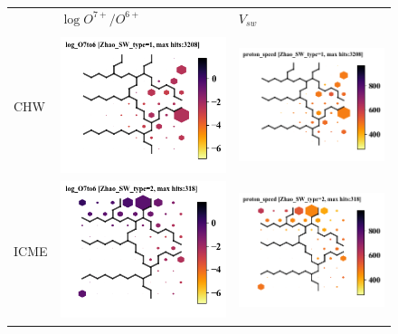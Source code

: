 \documentclass[utf8]{frontiersSCNS} %
\begin{document}
\begin{figure}[h!]\centering
	\begin{tabular}{m{1cm}CC}
		 & $\log O^{7+}/O^{6+}$ & $V_{sw}$ \\ \\
		CHW & \includegraphics[width=6cm]{Amaya/SWtype-Zhao_SW_type-1-log_O7to6} &
		\includegraphics[width=6cm]{Amaya/SWtype-Zhao_SW_type-1-proton_speed}\hfill	\\
		ICME & \includegraphics[width=6cm]{Amaya/SWtype-Zhao_SW_type-2-log_O7to6} &
		\includegraphics[width=6cm]{Amaya/SWtype-Zhao_SW_type-2-proton_speed}\hfill	\\

\end{tabular}
\end{figure}
\end{document}
